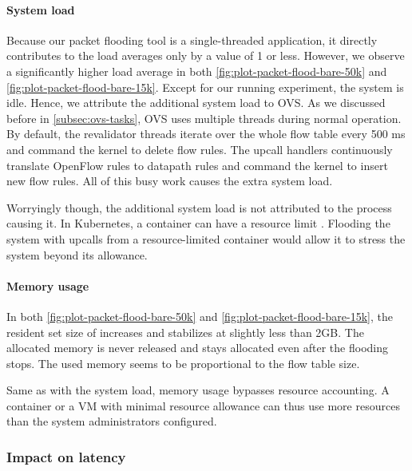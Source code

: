 \paragraph{System load}
Because our packet flooding tool is a single-threaded application, it directly contributes to the load averages only by a value of 1 or less. However, we observe a significantly higher load average in both \cref{fig:plot-packet-flood-bare-50k} and \cref{fig:plot-packet-flood-bare-15k}. Except for our running experiment, the system is idle. Hence, we attribute the additional system load to OVS. As we discussed before in \cref{subsec:ovs-tasks}, OVS uses multiple threads during normal operation. By default, the revalidator threads iterate over the whole flow table every 500 \si{\milli\second} and command the kernel to delete flow rules. The upcall handlers continuously translate OpenFlow rules to datapath rules and command the kernel to insert new flow rules. All of this busy work causes the extra system load.

Worryingly though, the additional system load is not attributed to the process causing it. In Kubernetes, a container can have a resource limit \cite{KubernetesResourceManagement}. Flooding the system with upcalls from a resource-limited container would allow it to stress the system beyond its allowance. 

\paragraph{Memory usage}
\label{par:memory-usage}
In both \cref{fig:plot-packet-flood-bare-50k} and \cref{fig:plot-packet-flood-bare-15k}, the resident set size of  increases and stabilizes at slightly less than 2GB. The allocated memory is never released and stays allocated even after the flooding stops. The used memory seems to be proportional to the flow table size.

Same as with the system load, memory usage bypasses resource accounting. A container or a VM with minimal resource allowance can thus use more resources than the system administrators configured.

\subsubsection{Impact on latency}


